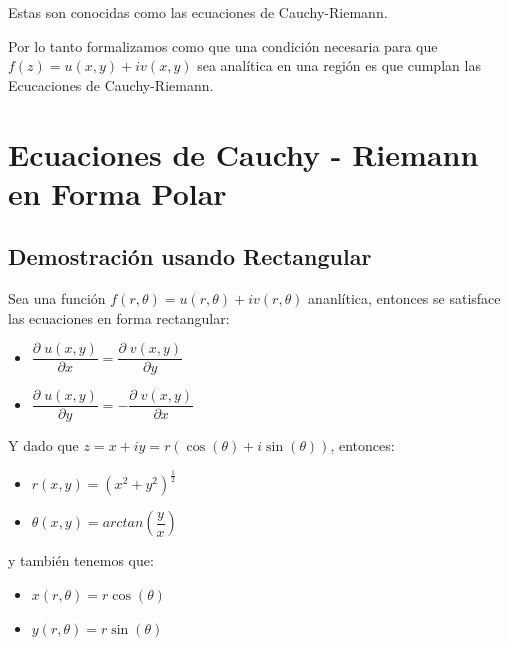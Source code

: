 \documentclass[12pt, fleqn]{report}                             %
\theoremstyle{break}                                            %
\newcommand{\Wrap}[1]           {\left( #1 \right)}             %
\newcommand{\pfrac}[2]      {\Wrap{\dfrac{#1}{#2}}}             %
\newcommand{\Cos}[1] {\cos\Wrap{#1}}                            %
\newcommand{\Sin}[1] {\sin\Wrap{#1}}                            %
\newcommand \Cis[1]  {\Cos{#1} + i \Sin{#1}}                    %
\newcommand \Partial[2] {\dfrac{\partial \; #1}{\partial #2}}   %
\begin{document}
            Estas son conocidas como las ecuaciones de Cauchy-Riemann.

            Por lo tanto formalizamos como que una condición necesaria para que
            $f(z) = u(x, y) + iv (x, y)$ sea analítica en una región es que cumplan
            las Ecucaciones de Cauchy-Riemann.


        \clearpage
        \section{Ecuaciones de Cauchy - Riemann en Forma Polar}

            \subsection{Demostración usando Rectangular}

                Sea una función $f(r, \theta) = u(r, \theta) + iv(r, \theta)$ ananlítica,
                entonces se satisface las ecuaciones en forma rectangular:

                \begin{itemize}
                    \item $\Partial{u(x, y)}{x} =   \Partial{v(x, y)}{y}$
                    \item $\Partial{u(x, y)}{y} = - \Partial{v(x, y)}{x}$
                \end{itemize}

                Y dado que $z = x + iy = r(\Cis{\theta})$, entonces:
                \begin{itemize}
                    \item $r(x, y) = \Wrap{x^2 + y^2}^{\frac{1}{2}}$
                    \item $\theta(x, y) = arctan\pfrac{y}{x}$
                \end{itemize}  

                y también tenemos que:
                \begin{itemize}
                    \item $x(r, \theta) = r\Cos{\theta}$
                    \item $y(r, \theta) = r\Sin{\theta}$
                \end{itemize}
\end{document}
